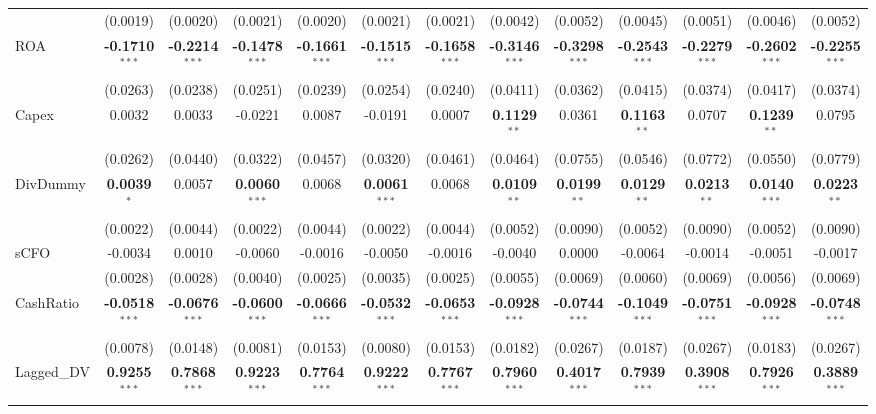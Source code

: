 \begin{landscape}
\begin{table}[H]
\begin{tabular}{lcccccccccccc}
 & (0.0019) & (0.0020) & (0.0021) & (0.0020) & (0.0021) & (0.0021) & (0.0042) & (0.0052) & (0.0045) & (0.0051) & (0.0046) & (0.0052) \\
ROA & \textbf{-0.1710}$^{***}$ & \textbf{-0.2214}$^{***}$ & \textbf{-0.1478}$^{***}$ & \textbf{-0.1661}$^{***}$ & \textbf{-0.1515}$^{***}$ & \textbf{-0.1658}$^{***}$ & \textbf{-0.3146}$^{***}$ & \textbf{-0.3298}$^{***}$ & \textbf{-0.2543}$^{***}$ & \textbf{-0.2279}$^{***}$ & \textbf{-0.2602}$^{***}$ & \textbf{-0.2255}$^{***}$ \\
 & (0.0263) & (0.0238) & (0.0251) & (0.0239) & (0.0254) & (0.0240) & (0.0411) & (0.0362) & (0.0415) & (0.0374) & (0.0417) & (0.0374) \\
Capex & 0.0032 & 0.0033 & -0.0221 & 0.0087 & -0.0191 & 0.0007 & \textbf{0.1129}$^{**}$ & 0.0361 & \textbf{0.1163}$^{**}$ & 0.0707 & \textbf{0.1239}$^{**}$ & 0.0795 \\
 & (0.0262) & (0.0440) & (0.0322) & (0.0457) & (0.0320) & (0.0461) & (0.0464) & (0.0755) & (0.0546) & (0.0772) & (0.0550) & (0.0779) \\
DivDummy & \textbf{0.0039}$^{*}$ & 0.0057 & \textbf{0.0060}$^{***}$ & 0.0068 & \textbf{0.0061}$^{***}$ & 0.0068 & \textbf{0.0109}$^{**}$ & \textbf{0.0199}$^{**}$ & \textbf{0.0129}$^{**}$ & \textbf{0.0213}$^{**}$ & \textbf{0.0140}$^{***}$ & \textbf{0.0223}$^{**}$ \\
 & (0.0022) & (0.0044) & (0.0022) & (0.0044) & (0.0022) & (0.0044) & (0.0052) & (0.0090) & (0.0052) & (0.0090) & (0.0052) & (0.0090) \\
sCFO & -0.0034 & 0.0010 & -0.0060 & -0.0016 & -0.0050 & -0.0016 & -0.0040 & 0.0000 & -0.0064 & -0.0014 & -0.0051 & -0.0017 \\
 & (0.0028) & (0.0028) & (0.0040) & (0.0025) & (0.0035) & (0.0025) & (0.0055) & (0.0069) & (0.0060) & (0.0069) & (0.0056) & (0.0069) \\
CashRatio & \textbf{-0.0518}$^{***}$ & \textbf{-0.0676}$^{***}$ & \textbf{-0.0600}$^{***}$ & \textbf{-0.0666}$^{***}$ & \textbf{-0.0532}$^{***}$ & \textbf{-0.0653}$^{***}$ & \textbf{-0.0928}$^{***}$ & \textbf{-0.0744}$^{***}$ & \textbf{-0.1049}$^{***}$ & \textbf{-0.0751}$^{***}$ & \textbf{-0.0928}$^{***}$ & \textbf{-0.0748}$^{***}$ \\
 & (0.0078) & (0.0148) & (0.0081) & (0.0153) & (0.0080) & (0.0153) & (0.0182) & (0.0267) & (0.0187) & (0.0267) & (0.0183) & (0.0267) \\
Lagged\_DV & \textbf{0.9255}$^{***}$ & \textbf{0.7868}$^{***}$ & \textbf{0.9223}$^{***}$ & \textbf{0.7764}$^{***}$ & \textbf{0.9222}$^{***}$ & \textbf{0.7767}$^{***}$ & \textbf{0.7960}$^{***}$ & \textbf{0.4017}$^{***}$ & \textbf{0.7939}$^{***}$ & \textbf{0.3908}$^{***}$ & \textbf{0.7926}$^{***}$ & \textbf{0.3889}$^{***}$ \\

\end{tabular}
\end{table}
\end{landscape}
